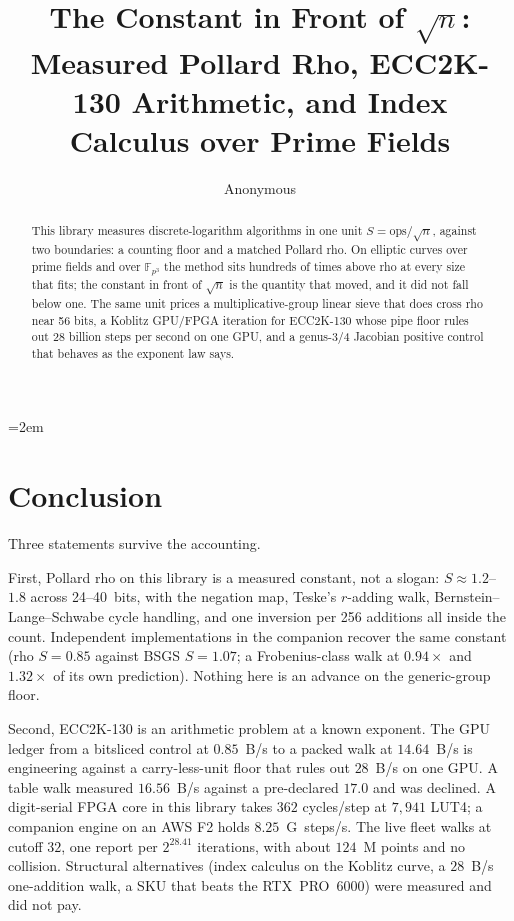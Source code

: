 \documentclass[11pt,a4paper]{article}
\title{The Constant in Front of $\sqrt{n}$: Measured Pollard Rho,
       ECC2K-130 Arithmetic, and Index Calculus over Prime Fields}
\author{Anonymous}
\date{}
\theoremstyle{definition}
\newcommand{\FF}{\mathbb{F}}
\begin{document}
\maketitle
\emergencystretch=2em

\begin{abstract}
This library measures discrete-logarithm algorithms in one unit
$S=\mathrm{ops}/\sqrt{n}$, against two boundaries: a counting floor
and a matched Pollard rho. On elliptic curves over prime fields and
over $\FF_{p^3}$ the method sits hundreds of times above rho at every
size that fits; the constant in front of $\sqrt{n}$ is the quantity
that moved, and it did not fall below one. The same unit prices a
multiplicative-group linear sieve that does cross rho near 56 bits, a
Koblitz GPU/FPGA iteration for ECC2K-130 whose pipe floor rules out
28 billion steps per second on one GPU, and a genus-3/4 Jacobian
positive control that behaves as the exponent law says.
\end{abstract}

\tableofcontents
\clearpage












\section{Conclusion}
\label{sec:conclusion}

Three statements survive the accounting.

First, Pollard rho on this library is a measured constant, not a slogan:
$S \approx 1.2$--$1.8$ across 24--40~bits, with the negation map, Teske's
$r$-adding walk, Bernstein--Lange--Schwabe cycle handling, and one
inversion per 256 additions all inside the count. Independent
implementations in the companion recover the same constant (rho $S=0.85$
against BSGS $S=1.07$; a Frobenius-class walk at $0.94\times$ and
$1.32\times$ of its own prediction). Nothing here is an advance on the
generic-group floor.

Second, ECC2K-130 is an arithmetic problem at a known exponent. The
GPU ledger from a bitsliced control at $0.85$~B/s to a packed walk at
$14.64$~B/s is engineering against a carry-less-unit floor that rules
out $28$~B/s on one GPU. A table walk measured $16.56$~B/s against a
pre-declared $17.0$ and was declined. A digit-serial FPGA core in this
library takes $362$ cycles/step at $7{,}941$ LUT4; a companion engine
on an AWS F2 holds $8.25$~G~steps/s. The live fleet walks at cutoff
$32$, one report per $2^{28.41}$ iterations, with about $124$~M points
and no collision. Structural alternatives (index calculus on the
Koblitz curve, a $28$~B/s one-addition walk, a SKU that beats the
RTX~PRO~6000) were measured and did not pay.
\end{document}
